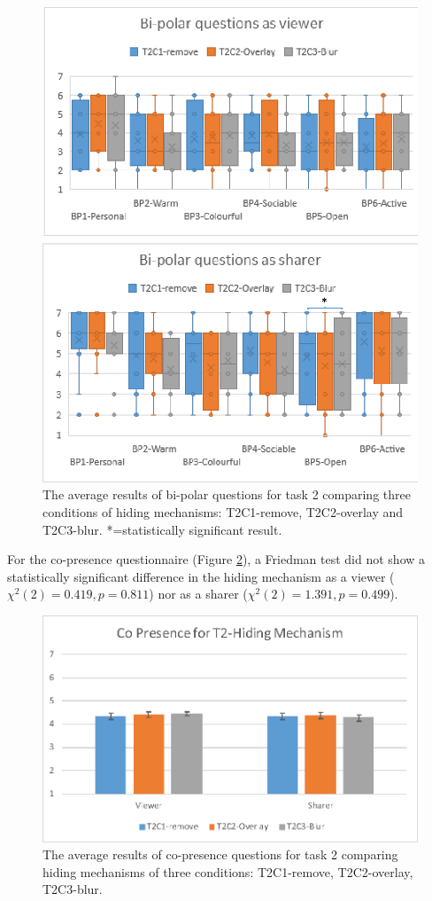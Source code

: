\begin{figure}
    \begin{center}
    \includegraphics[width=.8\linewidth]{images/54-hiding-frontier18/images-12.eps}
    \caption{The average results of bi-polar questions for task 2 comparing three conditions of hiding mechanisms: T2C1-remove, T2C2-overlay and T2C3-blur. *=statistically significant result.}
    \label{fig:frontier18:result-bipolar-hiding}
    \end{center}
\end{figure}

For the co-presence questionnaire (Figure \ref{fig:frontier18:result-copresence-hiding}), a Friedman test did not show a statistically significant difference in the hiding mechanism as a viewer ($\chi^2(2)=0.419, p=0.811$) nor as a sharer ($\chi^2(2)=1.391, p=0.499$).

\begin{figure}
    \begin{center}
    \includegraphics[width=.8\linewidth]{images/54-hiding-frontier18/images-11.eps}
    \caption{The average results of co-presence questions for task 2 comparing hiding mechanisms of three conditions: T2C1-remove, T2C2-overlay, T2C3-blur.}
    \label{fig:frontier18:result-copresence-hiding}
    \end{center}
\end{figure}

